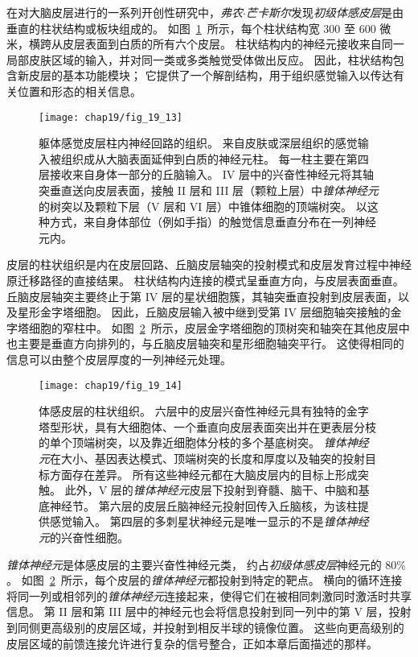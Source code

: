 在对大脑皮层进行的一系列开创性研究中，\textit{弗农$\cdot$芒卡斯尔}发现\textit{初级体感皮层}是由垂直的柱状结构或板块组成的。
如图~\ref{fig:19_13}~所示，每个柱状结构宽 300 至 600 微米，横跨从皮层表面到白质的所有六个皮层。
柱状结构内的神经元接收来自同一局部皮肤区域的输入，并对同一类或多类触觉受体做出反应。
因此，柱状结构包含新皮层的基本功能模块；
它提供了一个解剖结构，用于组织感觉输入以传达有关位置和形态的相关信息。


\begin{figure}[htbp]
	\centering
	\texttt{[image: chap19/fig\_19\_13]}
	\caption{躯体感觉皮层柱内神经回路的组织。
		来自皮肤或深层组织的感觉输入被组织成从大脑表面延伸到白质的神经元柱。
		每一柱主要在第四层接收来自身体一部分的丘脑输入。
		IV 层中的兴奋性神经元将其轴突垂直送向皮层表面，接触 II 层和 III 层（颗粒上层）中\textit{锥体神经元}的树突以及颗粒下层（V 层和 VI 层）中锥体细胞的顶端树突。
		以这种方式，来自身体部位（例如手指）的触觉信息垂直分布在一列神经元内。}
	\label{fig:19_13}
\end{figure}


皮层的柱状组织是内在皮层回路、丘脑皮层轴突的投射模式和皮层发育过程中神经原迁移路径的直接结果。
柱状结构内连接的模式呈垂直方向，与皮层表面垂直。
丘脑皮层轴突主要终止于第 IV 层的星状细胞簇，其轴突垂直投射到皮层表面，以及星形金字塔细胞。
因此，丘脑皮层输入被中继到受第 IV 层细胞轴突接触的金字塔细胞的窄柱中。
如图~\ref{fig:19_14}~所示，皮层金字塔细胞的顶树突和轴突在其他皮层中也主要是垂直方向排列的，与丘脑皮层轴突和星形细胞轴突平行。
这使得相同的信息可以由整个皮层厚度的一列神经元处理。


\begin{figure}[htbp]
	\centering
	\texttt{[image: chap19/fig\_19\_14]}
	\caption{体感皮层的柱状组织。
		六层中的皮层兴奋性神经元具有独特的金字塔型形状，具有大细胞体、一个垂直向皮层表面突出并在更表层分枝的单个顶端树突，以及靠近细胞体分枝的多个基底树突。
		\textit{锥体神经元}在大小、基因表达模式、顶端树突的长度和厚度以及轴突的投射目标方面存在差异。
		所有这些神经元都在大脑皮层内的目标上形成突触。
		此外，V 层的\textit{锥体神经元}皮层下投射到脊髓、脑干、中脑和基底神经节。
		第六层的皮层丘脑神经元投射回传入丘脑核，为该柱提供感觉输入。
		第四层的多刺星状神经元是唯一显示的不是\textit{锥体神经元}的兴奋性细胞\cite{oberlaender2012cell}。}
	\label{fig:19_14}
\end{figure}


\textit{锥体神经元}是体感皮层的主要兴奋性神经元类，
约占\textit{初级体感皮层}神经元的 80\% 。 
如图~\ref{fig:19_14}~所示，每个皮层的\textit{锥体神经元}都投射到特定的靶点。
横向的循环连接将同一列或相邻列的\textit{锥体神经元}连接起来，使得它们在被相同刺激同时激活时共享信息。
第 II 层和第 III 层中的神经元也会将信息投射到同一列中的第 V 层，投射到同侧更高级别的皮层区域，并投射到相反半球的镜像位置。
这些向更高级别的皮层区域的前馈连接允许进行复杂的信号整合，正如本章后面描述的那样。


